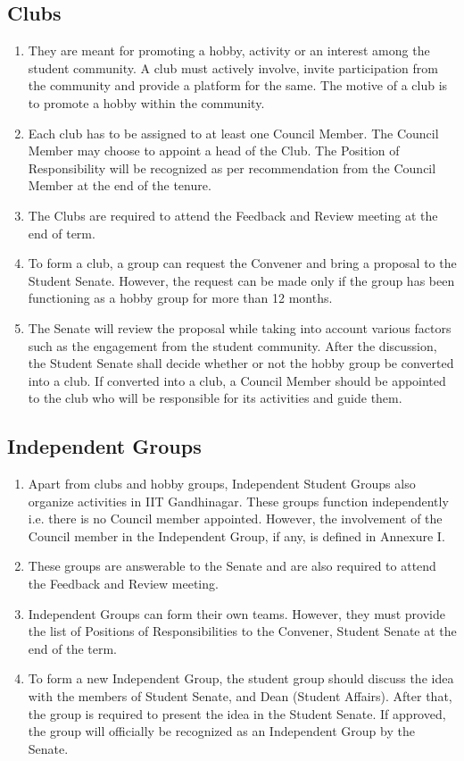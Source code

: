 \documentclass[12pt]{article}
\begin{document}
\subsection{Clubs}
\begin{enumerate}
    \item They are meant for promoting a hobby, activity or an interest among the student community. A club must actively involve, invite participation from the community and provide a platform for the same. The motive of a club is to promote a hobby within the community.
    \item Each club has to be assigned to at least one Council Member. The Council Member may choose to appoint a head of the Club. The Position of Responsibility will be recognized as per recommendation from the Council Member at the end of the tenure.
    \item The Clubs are required to attend the Feedback and Review meeting at the end of term.
    \item To form a club, a group can request the Convener and bring a proposal to the Student Senate. However, the request can be made only if the group has been functioning as a hobby group for more than 12 months.
    \item The Senate will review the proposal while taking into account various factors such as the engagement from the student community. After the discussion, the Student Senate shall decide whether or not the hobby group be converted into a club. If converted into a club, a Council Member should be appointed to the club who will be responsible for its activities and guide them.
\end{enumerate}

\subsection{Independent Groups} 
\begin{enumerate}
    \item Apart from clubs and hobby groups, Independent Student Groups also organize activities in IIT Gandhinagar. These groups function independently i.e. there is no Council member appointed. However, the involvement of the Council member in the Independent Group, if any, is defined in Annexure I.
    \item These groups are answerable to the Senate and are also required to attend the Feedback and Review meeting.
    \item Independent Groups can form their own teams. However, they must provide the list of Positions of Responsibilities to the Convener, Student Senate at the end of the term.
    \item To form a new Independent Group, the student group should discuss the idea with the members of Student Senate, and Dean (Student Affairs). After that, the group is required to present the idea in the Student Senate. If approved, the group will officially be recognized as an Independent Group by the Senate.
\end{enumerate}
\end{document}
